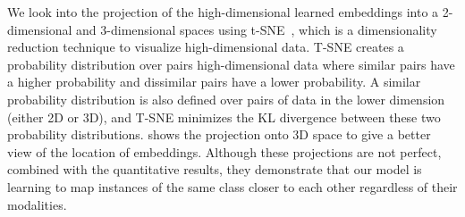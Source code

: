 \documentclass[sigconf,natbib=true,anonymous=true]{acmart}
\newcommand{\todokdinline}[1]{\todo[color=red!20,inline]{{KD: \small #1}}}
\newcommand{\Rephrase}[1]{{\textbf {\color{red}Rephrase please #1}}}
\begin{document}
We look into the projection of the high-dimensional learned embeddings into a 2-dimensional and 3-dimensional spaces using t-SNE~\cite{van2008tsne}, which is a dimensionality reduction technique to visualize high-dimensional data. T-SNE creates a probability distribution over pairs high-dimensional data where similar pairs have a higher probability and dissimilar pairs have a lower probability. A similar probability distribution is also defined over pairs of data in the lower dimension (either 2D or 3D), and T-SNE minimizes the KL divergence between these two probability distributions.
 shows the projection onto 3D space to give a better view of the location of embeddings. Although these projections are not perfect, combined with the quantitative results, they demonstrate that our model is learning to map instances of the same class closer to each other regardless of their modalities.




\end{document}

